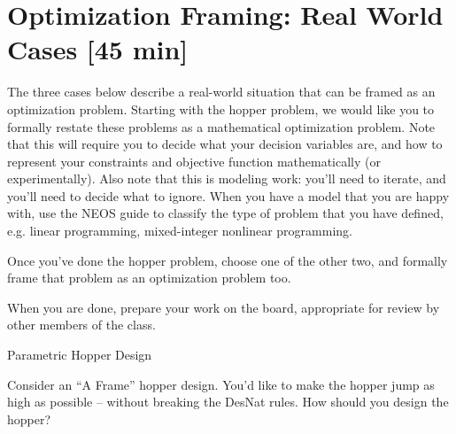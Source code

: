 \documentclass{tufte-handout}
\begin{document}
\clearpage

\section{Optimization Framing: Real World Cases [45 min]}

The three cases below describe a real-world situation that can be framed as an optimization problem.  Starting with the hopper problem, we would like you to formally restate these problems as a mathematical optimization problem.  Note that this will require you to decide what your decision variables are, and how to represent your constraints and objective function mathematically (or experimentally).  Also note that this is modeling work: you'll need to iterate, and you'll need to decide what to ignore. When you have a model that you are happy with, use the NEOS guide to classify the type of problem that you have defined, e.g. linear programming, mixed-integer nonlinear programming.

Once you've done the hopper problem, choose one of the other two, and formally frame that problem as an optimization problem too.  

When you are done, prepare your work on the board, appropriate for review by other members of the class.

\be[resume]
\item Parametric Hopper Design

Consider an ``A Frame'' hopper design.  You'd like to make the hopper jump as high as possible -- without breaking the DesNat rules.  How should you design the hopper?
%



\end{document}
